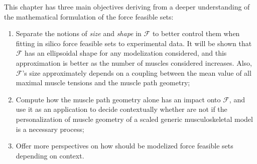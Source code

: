 This chapter has three main objectives deriving from a deeper understanding of the mathematical formulation of the force feasible sets:
\begin{enumerate}[noitemsep]
    \item {Separate the notions of \emph{size} and \emph{shape} in $\mathcal{F}$ to better control them when fitting in silico force feasible sets to experimental data. It will be shown that $\mathcal{F}$ has an ellipsoidal shape for any modelization considered, and this approximation is better as the number of muscles considered increases. Also, $\mathcal{F}$'s size approximately depends on a coupling between the mean value of all maximal muscle tensions and the muscle path geometry;}
    \item {Compute how the muscle path geometry alone has an impact onto $\mathcal{F}$, and use it as an application to decide contextually whether are not if the personalization of muscle geometry of a scaled generic musculoskeletal model is a necessary process;}
    \item {Offer more perspectives on how should be modelized force feasible sets depending on context.}
\end{enumerate}


